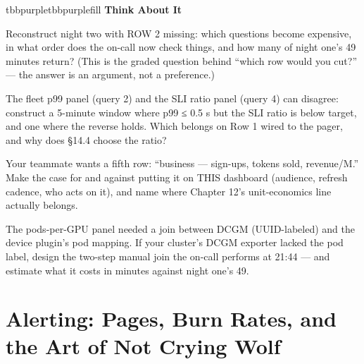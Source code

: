 \begin{calloutbox}{tbbpurple}{tbbpurplefill}
{\normalsize\bfseries\color{tbbpurple}Think About It}\par\vspace{3pt}
\begin{tbbitemize}
  \item Reconstruct night two with ROW 2 missing: which questions become expensive, in what order does the on-call now check things, and how many of night one’s 49 minutes return? (This is the graded question behind “which row would you cut?” — the answer is an argument, not a preference.)
  \item The fleet p99 panel (query 2) and the SLI ratio panel (query 4) can disagree: construct a 5-minute window where p99 ≤ 0.5 s but the SLI ratio is below target, and one where the reverse holds. Which belongs on Row 1 wired to the pager, and why does §14.4 choose the ratio?
  \item Your teammate wants a fifth row: “business — sign-ups, tokens sold, revenue/M.” Make the case for and against putting it on THIS dashboard (audience, refresh cadence, who acts on it), and name where Chapter 12’s unit-economics line actually belongs.
  \item The pods-per-GPU panel needed a join between DCGM (UUID-labeled) and the device plugin’s pod mapping. If your cluster’s DCGM exporter lacked the pod label, design the two-step manual join the on-call performs at 21:44 — and estimate what it costs in minutes against night one’s 49.
\end{tbbitemize}
\end{calloutbox}

\section{Alerting: Pages, Burn Rates, and the Art of Not Crying Wolf}

